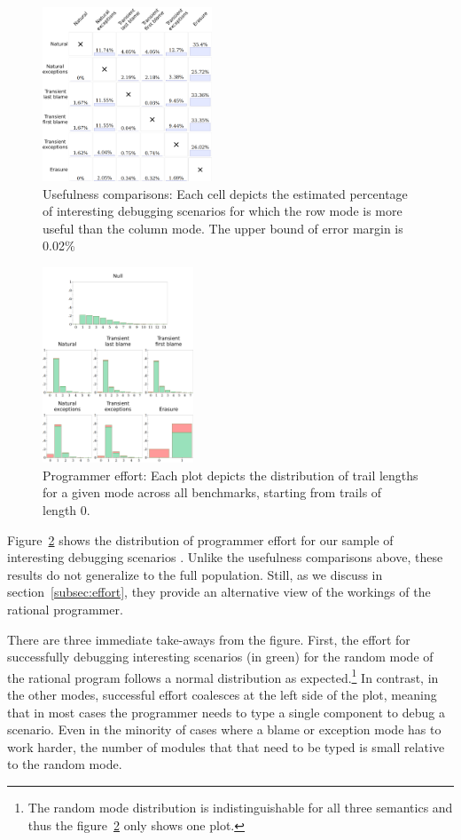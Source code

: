 \begin{figure}
  \centering
  \includegraphics[width=0.45\textwidth]{./plots/avo-matrix}
  \caption{Usefulness comparisons: Each cell depicts the estimated percentage of
  interesting debugging scenarios for which the row mode is more useful
  than the column mode.
  The upper bound of error margin is 0.02\%}
  \label{fig:avo-matrix}
\end{figure}


\begin{figure}
  \centering
  \includegraphics[width=0.4\textwidth]{./plots/bt-lengths-table}
  \caption{Programmer effort: Each plot depicts the distribution of trail
  lengths for a given mode across all benchmarks, starting from trails
  of length 0.}
  \label{fig:effort-table}
\end{figure}


Figure~\ref{fig:effort-table} shows the distribution of programmer effort
for our sample of interesting debugging scenarios . Unlike the usefulness
comparisons above, these results do not generalize to the full population.
Still, as we discuss in section~\ref{subsec:effort}, they provide an
alternative view of the workings of the rational programmer. 

There are
three immediate take-aways from the figure. First, the effort for successfully
debugging interesting scenarios (in green) for the random mode of the
rational program  follows  a normal distribution as expected.\footnote{The
random mode distribution is indistinguishable for all three semantics and thus the figure~\ref{fig:effort-table} 
only shows one plot.} In contrast, in the other modes, successful effort coalesces at
the left side of the plot, meaning that in most cases the programmer needs
to type a single component to debug a scenario. Even in the minority of
cases where a blame or exception mode has to work harder, the number of
modules that that need to be typed is small relative to the random mode. 

